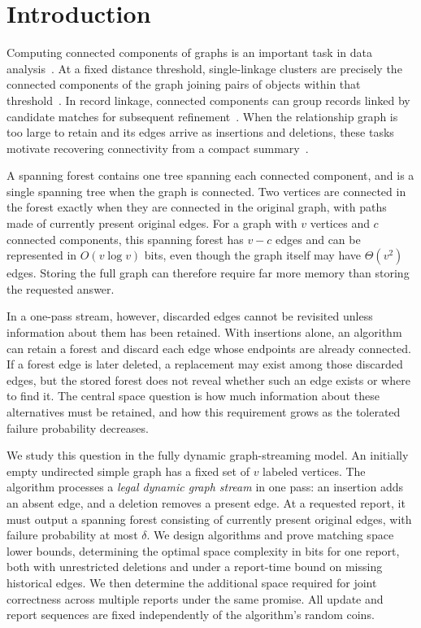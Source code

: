 \documentclass[11pt,letterpaper]{article}
\numberwithin{equation}{section}
\begin{document}
\section{Introduction}
\label{sec:graph-introduction}

Computing connected components of graphs is an important task in data analysis~\cite{TenchEtAl2025Landscape}.
At a fixed distance threshold, single-linkage clusters are precisely the connected components of the graph joining pairs of objects within that threshold~\cite{GowerRoss1969}.
In record linkage, connected components can group records linked by candidate matches for subsequent refinement~\cite{MamunAseltineRajasekaran2016}.
When the relationship graph is too large to retain and its edges arrive as insertions and deletions, these tasks motivate recovering connectivity from a compact summary~\cite{AGM2012}.

A spanning forest contains one tree spanning each connected component, and is a single spanning tree when the graph is connected.
Two vertices are connected in the forest exactly when they are connected in the original graph, with paths made of currently present original edges.
For a graph with $v$ vertices and $c$ connected components, this spanning forest has $v-c$ edges and can be represented in $O(v\log v)$ bits, even though the graph itself may have $\Theta(v^2)$ edges.
Storing the full graph can therefore require far more memory than storing the requested answer.

In a one-pass stream, however, discarded edges cannot be revisited unless information about them has been retained.
With insertions alone, an algorithm can retain a forest and discard each edge whose endpoints are already connected.
If a forest edge is later deleted, a replacement may exist among those discarded edges, but the stored forest does not reveal whether such an edge exists or where to find it.
The central space question is how much information about these alternatives must be retained, and how this requirement grows as the tolerated failure probability decreases.

We study this question in the fully dynamic graph-streaming model.
An initially empty undirected simple graph has a fixed set of $v$ labeled vertices.
The algorithm processes a \emph{legal dynamic graph stream} in one pass: an insertion adds an absent edge, and a deletion removes a present edge.
At a requested report, it must output a spanning forest consisting of currently present original edges, with failure probability at most $\delta$.
We design algorithms and prove matching space lower bounds, determining the optimal space complexity in bits for one report, both with unrestricted deletions and under a report-time bound on missing historical edges.
We then determine the additional space required for joint correctness across multiple reports under the same promise.
All update and report sequences are fixed independently of the algorithm's random coins.
\end{document}
